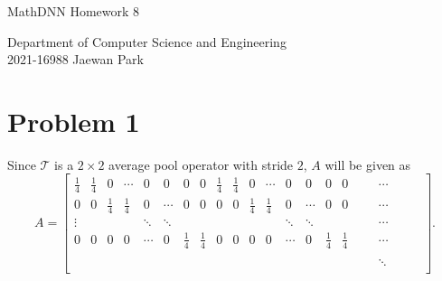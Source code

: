 \documentclass[10pt]{article}
\begin{document}
\begin{center}
    {\LARGE MathDNN Homework 8} \\
\end{center}
\begin{flushright}
    Department of Computer Science and Engineering \\
    2021-16988 Jaewan Park
\end{flushright}

\section*{Problem 1}
Since $\mathcal{T}$ is a $2 \times 2$ average pool operator with stride $2$, $A$ will be given as
\begin{equation*}
    A = \begin{bmatrix*}
        \frac{1}{4} & \frac{1}{4}   & 0             & \cdots        & 0             & 0             & 0             & 0             & \frac{1}{4}   & \frac{1}{4}   & 0             & \cdots        & 0             & 0             & 0             & 0             & & & \cdots & & & \\
        0           & 0             & \frac{1}{4}   & \frac{1}{4}   & 0             & \cdots        & 0             & 0             & 0             & 0             & \frac{1}{4}   & \frac{1}{4}   & 0             & \cdots        & 0             & 0             & & & \cdots & & & \\
        \vdots      &               &               &               & \ddots        & \ddots        &               &               &               &               &               &               & \ddots        & \ddots        &               &               & & & \cdots & & & \\
        0           & 0             & 0             & 0             & \cdots        & 0             & \frac{1}{4}   & \frac{1}{4}   & 0             & 0             & 0             & 0             & \cdots        & 0             & \frac{1}{4}   & \frac{1}{4}   & & & \cdots & & & \\
        \\
                    &               &               &               &               &               &               &               &               &               &               &               &               &               &               &               & & & \ddots       \\  
    \end{bmatrix*}.
\end{equation*}
\end{document}
